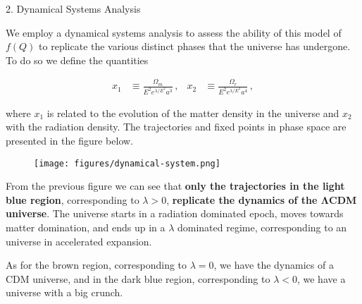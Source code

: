 \begin{block}{2. Dynamical Systems Analysis}

We employ a dynamical systems analysis to assess the ability of this model of $f(Q)$ to replicate the various distinct phases that the universe has undergone. To do so we define the quantities

\vspace{-1cm}
\begin{align}
    x_1 &\equiv \frac{\Omega_m}{E^2 e^{\lambda / E^2} a^3} \,,
    &
    x_2 &\equiv \frac{\Omega_r}{E^2 e^{\lambda / E^2} a^4} \,,
\end{align}

where $x_1$ is related to the evolution of the matter density in the universe and $x_2$ with the radiation density. The trajectories and fixed points in phase space are presented in the figure below.

\begin{figure}[h!]
    \centering
    \texttt{[image: figures/dynamical-system.png]}
\end{figure}

From the previous figure we can see that \textbf{only the trajectories in the light blue region}, corresponding to $\lambda > 0$, \textbf{replicate the dynamics of the $\boldsymbol{\Lambda}$CDM universe}. The universe starts in a radiation dominated epoch, moves towards matter domination, and ends up in a $\lambda$ dominated regime, corresponding to an universe in accelerated expansion.

As for the brown region, corresponding to $\lambda = 0$, we have the dynamics of a CDM universe, and in the dark blue region, corresponding to $\lambda < 0$, we have a universe with a big crunch.




\end{block}